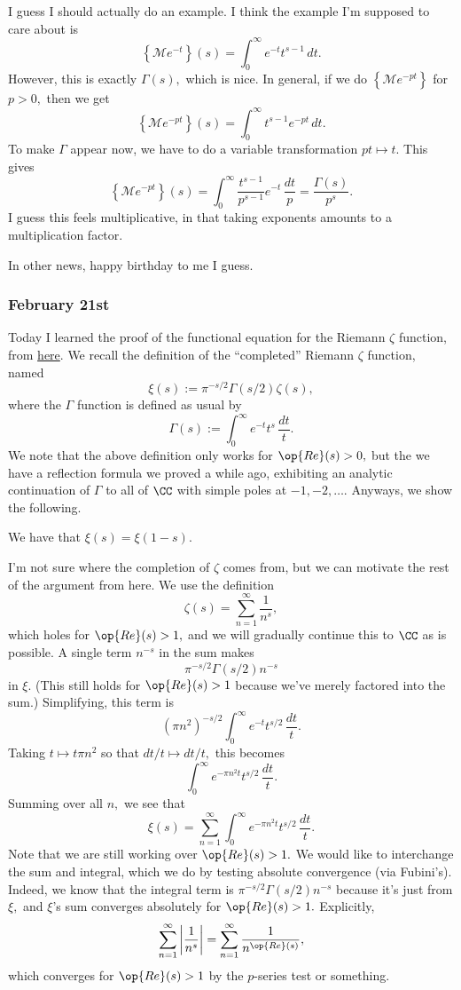 I guess I should actually do an example. I think the example I'm supposed to care about is
\[\left\{\mathcal Me^{-t}\right\}(s)=\int_0^\infty e^{-t}t^{s-1}\,dt.\]
However, this is exactly $\Gamma(s),$ which is nice. In general, if we do $\left\{\mathcal Me^{-pt}\right\}$ for $p>0,$ then we get
\[\left\{\mathcal Me^{-pt}\right\}(s)=\int_0^\infty t^{s-1}e^{-pt}\,dt.\]
To make $\Gamma$ appear now, we have to do a variable transformation $pt\mapsto t.$ This gives
\[\left\{\mathcal Me^{-pt}\right\}(s)=\int_0^\infty\frac{t^{s-1}}{p^{s-1}}e^{-t}\,\frac{dt}p=\frac{\Gamma(s)}{p^s}.\]
I guess this feels multiplicative, in that taking exponents amounts to a multiplication factor.

In other news, happy birthday to me I guess.

\subsubsection{February 21st}
Today I learned the proof of the functional equation for the Riemann $\zeta$ function, from \href{http://math.mit.edu/~poonen/786/notes.pdf}{here}. We recall the definition of the ``completed'' Riemann $\zeta$ function, named
\[\xi(s):=\pi^{-s/2}\Gamma(s/2)\zeta(s),\]
where the $\Gamma$ function is defined as usual by
\[\Gamma(s):=\int_0^\infty e^{-t}t^s\,\frac{dt}t.\]
We note that the above definition only works for $\op{Re}(s)>0,$ but the we have a reflection formula we proved a while ago, exhibiting an analytic continuation of $\Gamma$ to all of $\CC$ with simple poles at $-1,-2,\ldots.$ Anyways, we show the following.
\begin{theorem}
    We have that $\xi(s)=\xi(1-s).$
\end{theorem}

I'm not sure where the completion of $\zeta$ comes from, but we can motivate the rest of the argument from here. We use the definition
\[\zeta(s)=\sum_{n=1}^\infty\frac1{n^s},\]
which holes for $\op{Re}(s)>1,$ and we will gradually continue this to $\CC$ as is possible. A single term $n^{-s}$ in the sum makes
\[\pi^{-s/2}\Gamma(s/2)n^{-s}\]
in $\xi.$ (This still holds for $\op{Re}(s)>1$ because we've merely factored into the sum.) Simplifying, this term is
\[\left(\pi n^2\right)^{-s/2}\int_0^\infty e^{-t}t^{s/2}\,\frac{dt}t.\]
Taking $t\mapsto t\pi n^2$ so that $dt/t\mapsto dt/t,$ this becomes
\[\int_0^\infty e^{-\pi n^2t}t^{s/2}\,\frac{dt}t.\]
Summing over all $n,$ we see that
\[\xi(s)=\sum_{n=1}^\infty\int_0^\infty e^{-\pi n^2t}t^{s/2}\,\frac{dt}t.\]
Note that we are still working over $\op{Re}(s)>1.$ We would like to interchange the sum and integral, which we do by testing absolute convergence (via Fubini's). Indeed, we know that the integral term is $\pi^{-s/2}\Gamma(s/2)n^{-s}$ because it's just from $\xi,$ and $\xi$'s sum converges absolutely for $\op{Re}(s)>1.$ Explicitly,
\[\sum_{n=1}^\infty\left|\frac1{n^s}\right|=\sum_{n=1}^\infty\frac1{n^{\op{Re}(s)}},\]
which converges for $\op{Re}(s)>1$ by the $p$-series test or something.

